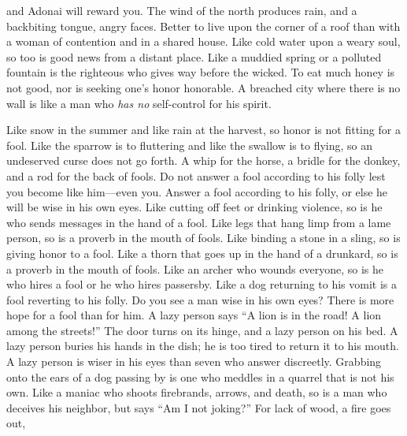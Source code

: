 \begin{biblechapter}
and Adonai will reward you.
\verse The wind of the north produces rain, 
and a backbiting tongue, angry faces.
\verse Better to live upon the corner of a roof 
than with a woman of contention and in a shared house.
\verse Like cold water upon a weary soul, 
so too is good news from a distant place.
\verse Like a muddied spring or a polluted fountain 
is the righteous who gives way before the wicked.
\verse To eat much honey is not good, 
nor is seeking one’s honor honorable.
\verse A breached city where there is no wall 
is like a man who \textit{has no} self-control for his spirit.
\end{biblechapter}

\begin{biblechapter} %
\verse Like snow in the summer and like rain at the harvest, 
so honor is not fitting for a fool.
\verse Like the sparrow is to fluttering and like the swallow is to flying, 
so an undeserved curse does not go forth.
\verse A whip for the horse, a bridle for the donkey, 
and a rod for the back of fools.
\verse Do not answer a fool according to his folly 
lest you become like him—even you.
\verse Answer a fool according to his folly, 
or else he will be wise in his own eyes.
\verse Like cutting off feet or drinking violence, 
so is he who sends messages in the hand of a fool.
\verse Like legs that hang limp from a lame person, 
so is a proverb in the mouth of fools.
\verse Like binding a stone in a sling, 
so is giving honor to a fool.
\verse Like a thorn that goes up in the hand of a drunkard, 
so is a proverb in the mouth of fools.
\verse Like an archer who wounds everyone, 
so is he who hires a fool or he who hires passersby.
\verse Like a dog returning to his vomit 
is a fool reverting to his folly.
\verse Do you see a man wise in his own eyes? 
There is more hope for a fool than for him.
\verse A lazy person says “A lion is in the road! 
A lion among the streets!”
\verse The door turns on its hinge, 
and a lazy person on his bed.
\verse A lazy person buries his hands in the dish; 
he is too tired to return it to his mouth.
\verse A lazy person is wiser in his eyes 
than seven who answer discreetly.
\verse Grabbing onto the ears of a dog 
passing by is one who meddles in a quarrel that is not his own.
\verse Like a maniac who shoots 
firebrands, arrows, and death,
\verse so is a man who deceives his neighbor, 
but says “Am I not joking?”
\verse For lack of wood, a fire goes out, 

\end{biblechapter}
